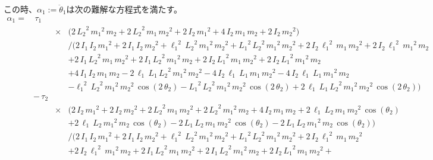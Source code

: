 \documentclass[a4paper,11pt]{jsarticle}
\begin{document}
この時、$\alpha_1 := \ddot{\theta}_1$は次の難解な方程式を満たす。
\tiny
\begin{align*}
  \alpha_1 =
  &\,\tau _{1} & &
  \\
    & &\times &
    \Bigg(2\,{L_2}^2\,{m_{1}}^2\,m_{2}+2\,{L_2}^2\,m_{1}\,{m_{2}}^2+2\,I_{2}\,{m_{1}}^2+4\,I_{2}\,m_{1}\,m_{2}+2\,I_{2}\,{m_{2}}^2\Bigg)
    \\
    & & &\Bigg/ 
    \Bigg(
      2\,I_{1}\,I_{2}\,{m_{1}}^2+
      2\,I_{1}\,I_{2}\,{m_{2}}^2+
      {\ell_{1}}^2\,{L_2}^2\,{m_{1}}^2\,{m_{2}}^2+
      {L_1}^2\,{L_2}^2\,{m_{1}}^2\,{m_{2}}^2+
      2\,I_{2}\,{\ell_{1}}^2\,m_{1}\,{m_{2}}^2+
      2\,I_{2}\,{\ell_{1}}^2\,{m_{1}}^2\,m_{2}
      \\ & & &+
      2\,I_{1}\,{L_2}^2\,m_{1}\,{m_{2}}^2+
      2\,I_{1}\,{L_2}^2\,{m_{1}}^2\,m_{2}+
      2\,I_{2}\,{L_1}^2\,m_{1}\,{m_{2}}^2+
      2\,I_{2}\,{L_1}^2\,{m_{1}}^2\,m_{2}
      \\ & & &+
      4\,I_{1}\,I_{2}\,m_{1}\,m_{2}-
      2\,\ell_{1}\,L_1\,{L_2}^2\,{m_{1}}^2\,{m_{2}}^2-
      4\,I_{2}\,\ell_{1}\,L_1\,m_{1}\,{m_{2}}^2-
      4\,I_{2}\,\ell_{1}\,L_1\,{m_{1}}^2\,m_{2}
      \\ & & &-
      {\ell_{1}}^2\,{L_2}^2\,{m_{1}}^2\,{m_{2}}^2\,\cos\left(2\,\theta_2\right)-
      {L_1}^2\,{L_2}^2\,{m_{1}}^2\,{m_{2}}^2\,\cos\left(2\,\theta_2\right)+
      2\,\ell_{1}\,L_1\,{L_2}^2\,{m_{1}}^2\,{m_{2}}^2\,\cos\left(2\,\theta_2\right)
    \Bigg)
  \\
  &-\,\tau _{2} & &
  \\
    & & \times &
    \Bigg(
      2\,I_{2}\,{m_{1}}^2+
      2\,I_{2}\,{m_{2}}^2+
      2\,{L_2}^2\,m_{1}\,{m_{2}}^2+
      2\,{L_2}^2\,{m_{1}}^2\,m_{2}+
      4\,I_{2}\,m_{1}\,m_{2}+
      2\,\ell_{1}\,L_2\,m_{1}\,{m_{2}}^2\,\cos\left(\theta_2\right)
      \\ & & &+
      2\,\ell_{1}\,L_2\,{m_{1}}^2\,m_{2}\,\cos\left(\theta_2\right)-
      2\,L_1\,L_2\,m_{1}\,{m_{2}}^2\,\cos\left(\theta_2\right)-
      2\,L_1\,L_2\,{m_{1}}^2\,m_{2}\,\cos\left(\theta_2\right)
    \Bigg)
    \\
    & & &\Bigg/
    \Bigg(
      2\,I_{1}\,I_{2}\,{m_{1}}^2+
      2\,I_{1}\,I_{2}\,{m_{2}}^2+
      {\ell_{1}}^2\,{L_2}^2\,{m_{1}}^2\,{m_{2}}^2+
      {L_1}^2\,{L_2}^2\,{m_{1}}^2\,{m_{2}}^2+
      2\,I_{2}\,{\ell_{1}}^2\,m_{1}\,{m_{2}}^2
      \\ & & &+
      2\,I_{2}\,{\ell_{1}}^2\,{m_{1}}^2\,m_{2}+
      2\,I_{1}\,{L_2}^2\,m_{1}\,{m_{2}}^2+
      2\,I_{1}\,{L_2}^2\,{m_{1}}^2\,m_{2}+
      2\,I_{2}\,{L_1}^2\,m_{1}\,{m_{2}}^2+

\end{align*}
\end{document}

